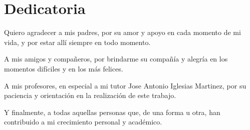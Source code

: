 \documentclass[12pt]{report} %
\begin{document}
\chapter*{Dedicatoria} %

\setcounter{page}{5}
	

	Quiero agradecer a mis padres, por su amor y apoyo en cada momento de mi vida, y por estar allí siempre en todo momento. 
	
	A mis amigos y compañeros, por brindarme su compañía y alegría en los momentos difíciles y en los más felices.
	
	A mis profesores, en especial a mi tutor Jose Antonio Iglesias Martinez, por su paciencia y orientación en la realización de este trabajo. 
	
	Y finalmente, a todas aquellas personas que, de una forma u otra, han contribuido a mi crecimiento personal y académico. 

		
	\vfill
	
	\newpage %
	\thispagestyle{empty}
	\mbox{}
	


\tableofcontents
\thispagestyle{fancy}

\newpage %
\thispagestyle{empty}
\mbox{}

\listoffigures
\thispagestyle{fancy}

\newpage %
\thispagestyle{empty}
\mbox{}

\listoftables
\thispagestyle{fancy}

\newpage %
\thispagestyle{empty}
\mbox{}


\clearpage
{} %



	
\end{document}
